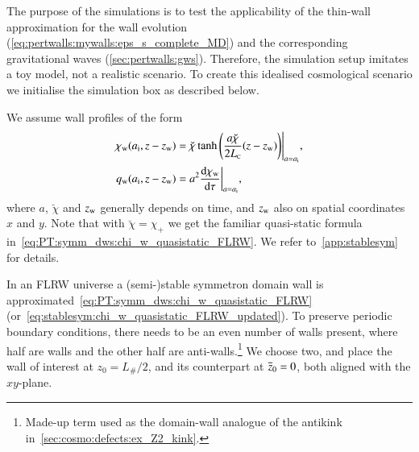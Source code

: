     The purpose of the simulations is to test the applicability of the thin-wall approximation for the wall evolution (\cref{eq:pertwalls:mywalls:eps_s_complete_MD}) and the corresponding gravitational waves (\cref{sec:pertwalls:gws}). Therefore, the simulation setup imitates a toy model, not a realistic scenario. To create this idealised cosmological scenario we initialise the simulation box as described below.


    We assume wall profiles of the form
    \begin{subequations}
        \begin{align}
            \chi_\mathrm{w}(a_\mathrm{i}, z- z_\mathrm{w}) &= {\breve{\chi}\tanh{{\left( \frac{a\breve{\chi}}{2L_{\text{\tiny{C}}}} (z-z\ensuremath{_\mathrm{w}})  \right)}} }\Bigg|_{a=a_\mathrm{i}}, \\
            q_\mathrm{w}(a_\mathrm{i}, z- z_\mathrm{w}) &= a^2 \dv{\chi\ensuremath{_\mathrm{w}}}{\tau}\bigg|_{a=a_\mathrm{i}},
        \end{align}
    \end{subequations}
    where $a$, $\breve{\chi}$ and $z_\mathrm{w}$ generally depends on time, and $z_\mathrm{w}$ also on spatial coordinates $x$ and $y$. Note that with $\breve{\chi}=\chi_+$ we get the familiar quasi-static formula in~\cref{eq:PT:symm_dws:chi_w_quasistatic_FLRW}. We refer to~\cref{app:stablesym} for details.

    In an FLRW universe a (semi-)stable symmetron domain wall is approximated~\cref{eq:PT:symm_dws:chi_w_quasistatic_FLRW} (or~\cref{eq:stablesym:chi_w_quasistatic_FLRW_updated}). To preserve periodic boundary conditions, there needs to be an even number of walls present, where half are walls and the other half are anti-walls.\footnote{Made-up term used as the domain-wall analogue of the antikink in~\cref{sec:cosmo:defects:ex_Z2_kink}.} %
    We choose two, and place the wall of interest at $z_0 = L_\#/2$, and its counterpart %
    at $\overline{z}_0=0$, both aligned with the $xy$-plane. %
    

